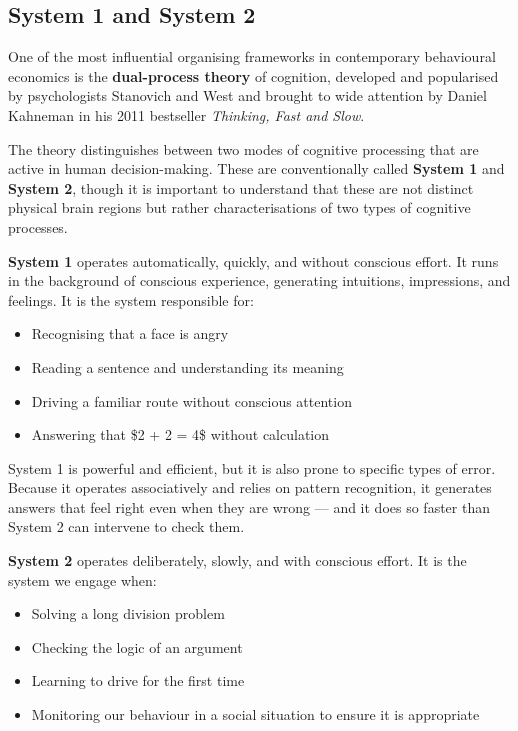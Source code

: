 \documentclass[12pt, letterpaper]{article}
\begin{document}
\subsection{System 1 and System 2}


One of the most influential organising frameworks in contemporary behavioural economics is the \textbf{dual-process theory} of cognition, developed and popularised by psychologists Stanovich and West and brought to wide attention by Daniel Kahneman in his 2011 bestseller \textit{Thinking, Fast and Slow}.

The theory distinguishes between two modes of cognitive processing that are active in human decision-making. These are conventionally called \textbf{System 1} and \textbf{System 2}, though it is important to understand that these are not distinct physical brain regions but rather characterisations of two types of cognitive processes.

\textbf{System 1} operates automatically, quickly, and without conscious effort. It runs in the background of conscious experience, generating intuitions, impressions, and feelings. It is the system responsible for:
\begin{itemize}
\item Recognising that a face is angry
\item Reading a sentence and understanding its meaning
\item Driving a familiar route without conscious attention
\item Answering that \$2 + 2 = 4\$ without calculation
\end{itemize}

System 1 is powerful and efficient, but it is also prone to specific types of error. Because it operates associatively and relies on pattern recognition, it generates answers that feel right even when they are wrong --- and it does so faster than System 2 can intervene to check them.

\textbf{System 2} operates deliberately, slowly, and with conscious effort. It is the system we engage when:
\begin{itemize}
\item Solving a long division problem
\item Checking the logic of an argument
\item Learning to drive for the first time
\item Monitoring our behaviour in a social situation to ensure it is appropriate
\end{itemize}
\end{document}
